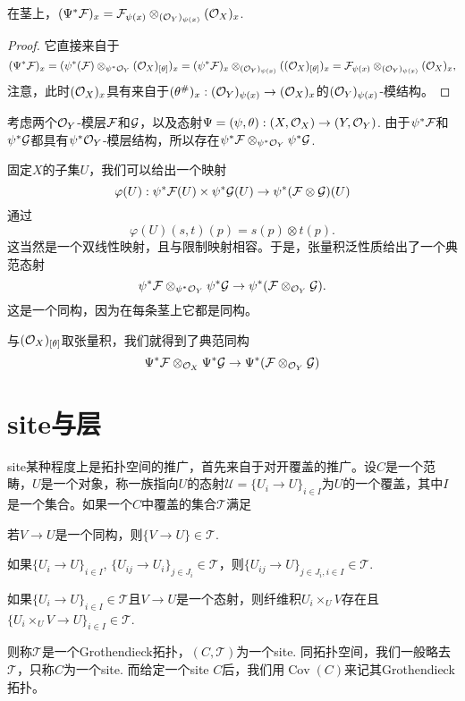 \begin{pro}
在茎上，$(\Psi^*\mathcal{F})_x=\mathcal{F}_{\psi(x)}\otimes_{(\mathcal{O}_Y)_{\psi(x)}} (\mathcal{O}_X)_{x}$.
\end{pro}

\begin{proof}
它直接来自于
\[
	(\Psi^*\mathcal{F})_x=(\psi^*(\mathcal{F})\otimes_{\psi^*\mathcal{O}_Y} (\mathcal{O}_X)_{[\theta]})_x=(\psi^*\mathcal{F})_x\otimes_{(\mathcal{O}_Y)_{\psi(x)}}((\mathcal{O}_X)_{[\theta]})_x=\mathcal{F}_{\psi(x)}\otimes_{(\mathcal{O}_Y)_{\psi(x)}}(\mathcal{O}_X)_x,
\]
注意，此时$(\mathcal{O}_X)_x$具有来自于$(\theta^\#)_x:(\mathcal{O}_Y)_{\psi(x)}\to (\mathcal{O}_X)_x$的$(\mathcal{O}_Y)_{\psi(x)}$-模结构。
\end{proof}

\begin{para}[张量积的逆像]
考虑两个$\mathcal{O}_Y$-模层$\mathcal{F}$和$\mathcal{G}$，以及态射$\Psi=(\psi,\theta):(X,\mathcal{O}_X)\to (Y,\mathcal{O}_Y)$. 由于$\psi^*\mathcal{F}$和$\psi^*\mathcal{G}$都具有$\psi^*\mathcal{O}_Y$-模层结构，所以存在$\psi^*\mathcal{F}\otimes_{\psi^*\mathcal{O}_Y}\psi^*\mathcal{G}$.

固定$X$的子集$U$，我们可以给出一个映射
\[
	\varphi(U):\psi^*\mathcal{F}(U)\times \psi^*\mathcal{G}(U) \to \psi^*(\mathcal{F}\otimes \mathcal{G})(U)
\]
通过
\[
	\varphi(U)(s,t)(p)=s(p)\otimes t(p).
\]
这当然是一个双线性映射，且与限制映射相容。于是，张量积泛性质给出了一个典范态射
\[
	\psi^*\mathcal{F}\otimes_{\psi^*\mathcal{O}_Y} \psi^*\mathcal{G} \to \psi^*(\mathcal{F}\otimes_{\mathcal{O}_Y} \mathcal{G}).
\]
这是一个同构，因为在每条茎上它都是同构。

与$(\mathcal{O}_X)_{[\theta]}$取张量积，我们就得到了典范同构
\[
	\Psi^*\mathcal{F}\otimes_{\mathcal{O}_X} \Psi^*\mathcal{G} \to \Psi^*(\mathcal{F}\otimes_{\mathcal{O}_Y} \mathcal{G})
\]
\end{para}

\section{site与层}

\begin{para}[site]
	site某种程度上是拓扑空间的推广，首先来自于对开覆盖的推广。设$C$是一个范畴，$U$是一个对象，称一族指向$U$的态射$\mathscr U = \{U_i\to U\}_{i\in I}$为$U$的一个覆盖，其中$I$是一个集合。如果一个$C$中覆盖的集合$\mathscr T$满足
	\begin{compactenum}
		\item 若$V\to U$是一个同构，则$\{V\to U\}\in \mathscr T$.
		\item 如果$\{U_i\to U\}_{i\in I}$, $\{U_{ij}\to U_i\}_{j\in J_i} \in \mathscr T$，则$\{U_{ij}\to U\}_{j\in J_i,i\in I}\in \mathscr T$.
		\item 如果$\{U_i\to U\}_{i\in I}\in \mathscr T$且$V\to U$是一个态射，则纤维积$U_i\times_U V$存在且$\{U_i\times_U V\to U\}_{i\in I}\in \mathscr T$.
	\end{compactenum}
	则称$\mathscr T$是一个Grothendieck拓扑，$(C,\mathscr T)$为一个site. 同拓扑空间，我们一般略去$\mathscr T$，只称$C$为一个site. 而给定一个site $C$后，我们用$\operatorname{Cov}(C)$来记其Grothendieck拓扑。
\end{para}

